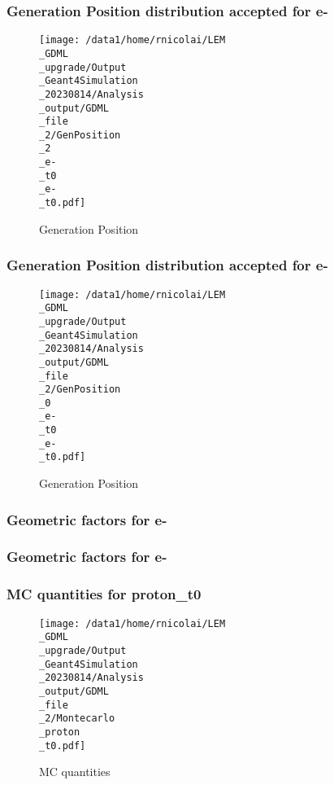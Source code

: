 \documentclass[8pt]{beamer}
\begin{document}
            \begin{frame}
                \frametitle{Generation Position distribution accepted for e-}
            
        \begin{figure}[h]
            \centering
            \texttt{[image: /data1/home/rnicolai/LEM\\\_GDML\\\_upgrade/Output\\\_Geant4Simulation\\\_20230814/Analysis\\\_output/GDML\\\_file\\\_2/GenPosition\\\_2\\\_e-\\\_t0\\\_e-\\\_t0.pdf]}
            \caption{Generation Position}
        \end{figure}
        
            \end{frame}
            
            \begin{frame}
                \frametitle{Generation Position distribution accepted for e-}
            
        \begin{figure}[h]
            \centering
            \texttt{[image: /data1/home/rnicolai/LEM\\\_GDML\\\_upgrade/Output\\\_Geant4Simulation\\\_20230814/Analysis\\\_output/GDML\\\_file\\\_2/GenPosition\\\_0\\\_e-\\\_t0\\\_e-\\\_t0.pdf]}
            \caption{Generation Position}
        \end{figure}
        
            \end{frame}
            
            \begin{frame}
                \frametitle{Geometric factors for e-}
            
            \end{frame}
            
            \begin{frame}
                \frametitle{Geometric factors for e-}
            
            \end{frame}
            
            \begin{frame}
                \frametitle{MC quantities for proton\_t0}
            
        \begin{figure}[h]
            \centering
            \texttt{[image: /data1/home/rnicolai/LEM\\\_GDML\\\_upgrade/Output\\\_Geant4Simulation\\\_20230814/Analysis\\\_output/GDML\\\_file\\\_2/Montecarlo\\\_proton\\\_t0.pdf]}
            \caption{MC quantities}
        \end{figure}
        
            \end{frame}
            
\end{document}
